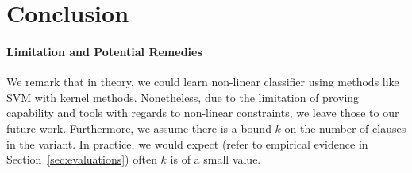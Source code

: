 
\section{Conclusion} \label{conclusion}


\paragraph{Limitation and Potential Remedies}
We remark that in theory, we could learn non-linear classifier using methods like SVM with kernel methods\cite{yu2009evolving}. 
Nonetheless, due to the limitation of proving capability and tools with regards to non-linear constraints, we leave those to our future work. 
Furthermore, we assume there is a bound $k$ on the number of clauses in the variant. 
In practice, we would expect (refer to empirical evidence in Section~\ref{sec:evaluations}) often $k$ is of a small value.
